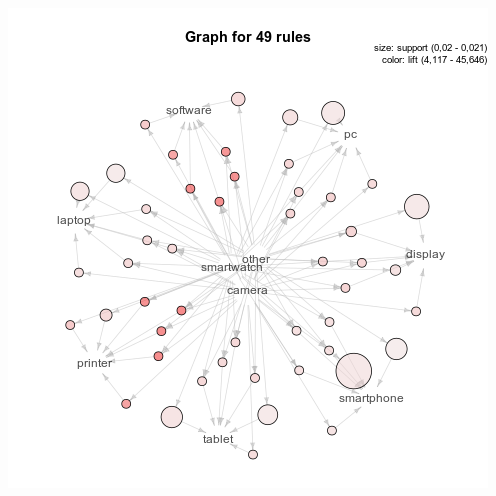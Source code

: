 \documentclass[12pt,a4paper,leqno]{report}
\theoremstyle{plain}
\theoremstyle{definition}
\theoremstyle{remark}
\begin{document}
\bigskip
{
    \centering
    \includegraphics[width=\textwidth,height=\textheight,keepaspectratio]{apriori_product_category_level_graph.png}
    \par
}
\bigskip
\end{document}
